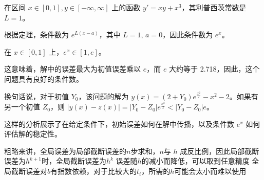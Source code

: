 \documentclass[UTF8,5pt,a4paper]{ctexart} %
\begin{document}
\begin{multicols}{4}






在区间 \( x \in [0,1], y \in [-\infty, \infty] \) 上的函数 \( y' = xy + x^3 \)，其利普西茨常数是 \( L = 1 \)。

根据定理，条件数为 \( e^{L(x - a)} \)，其中 \( L = 1 \), \( a = 0 \)，因此条件数为 \( e^x \)。

在 \( x \in [0,1] \) 上，\( e^x \in [1, e] \)。

这意味着，解中的误差最大为初值误差乘以 \( e \)，而 \( e \) 大约等于 2.718，因此，这个问题具有良好的条件数。

换句话说，对于初值 \( Y_0 \)，该问题的解为 \( y(x) = (2 + Y_0) e^{\frac{x^2}{2}} - x^2 - 2 \)。如果有另一个初值 \( Z_0 \)，则 \( |y(x) - z(x)| = |Y_0 - Z_0| e^{\frac{x^2}{2}} < |Y_0 - Z_0| e \)。

这样的分析展示了在给定条件下，初始误差如何在解中传播，以及条件数 \( e^x \) 如何评估解的稳定性。







粗略来讲，全局误差为局部截断误差的$n$步求和，$n$与 $h$ 成反比例，因此局部截断误差为$h^{k+1}$时，全局截断误差为$h^k$
误差随$h$的减小而降低，可以取到任意精度
全局截断误差对$b$有指数依赖，对于比较大的$t_i$，所需的$h$可能会太小而难以使用


\end{multicols}
\end{document}
